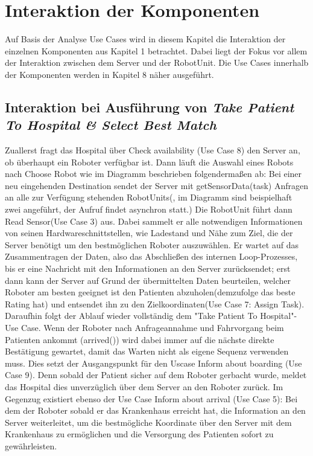 \section{Interaktion der Komponenten}
Auf Basis der Analyse Use Cases wird in diesem Kapitel die Interaktion der einzelnen Komponenten aus Kapitel 1 betrachtet. Dabei liegt der Fokus vor allem der Interaktion zwischen dem Server und der RobotUnit. Die Use Cases innerhalb der Komponenten werden in Kapitel 8 näher ausgeführt. \\


\subsection*{Interaktion bei Ausführung von \emph{Take Patient To Hospital & Select Best Match}}

Zuallerst fragt das Hospital über Check availability (Use Case 8) den Server an, ob überhaupt ein Roboter verfügbar ist. Dann läuft die Auswahl eines Robots nach Choose Robot wie im Diagramm beschrieben folgendermaßen ab: Bei einer neu eingehenden Destination sendet der Server mit getSensorData(task) Anfragen an alle zur Verfügung stehenden RobotUnits(, im Diagramm sind beispielhaft zwei angeführt, der Aufruf findet asynchron statt.) Die RobotUnit führt dann Read Sensor(Use Case 3) aus. Dabei sammelt er alle notwendigen Informationen von seinen Hardwareschnittstellen, wie Ladestand und Nähe zum Ziel, die der Server benötigt um den bestmöglichen Roboter auszuwählen. Er wartet auf das Zusammentragen der Daten, also das Abschließen des internen Loop-Prozesses, bis er eine Nachricht mit den Informationen an den Server zurücksendet; erst dann kann der Server auf Grund der übermittelten Daten beurteilen, welcher Roboter am besten geeignet ist den Patienten abzuholen(demzufolge das beste Rating hat) und entsendet ihn zu den Zielkoordinaten(Use Case 7: Assign Task). Daraufhin folgt der Ablauf wieder vollständig dem "Take Patient To Hospital"-Use Case. Wenn der Roboter nach Anfrageannahme und Fahrvorgang beim Patienten ankommt (arrived()) wird dabei immer auf die nächste direkte Bestätigung gewartet, damit das Warten nicht als eigene Sequenz verwenden muss. Dies setzt der Ausgangspunkt für den Uscase Inform about boarding (Use Case 9). Denn sobald der Patient sicher auf dem Roboter gerbacht wurde, meldet das Hospital dies unverzüglich über dem Server an den Roboter zurück. Im Gegenzug existiert ebenso der Use Case Inform about arrival (Use Case 5): Bei dem der Roboter sobald er das Krankenhaus erreicht hat, die Information an den Server weiterleitet, um die bestmögliche Koordinate über den Server mit dem Krankenhaus zu ermöglichen und die Versorgung des Patienten sofort zu gewährleisten.

